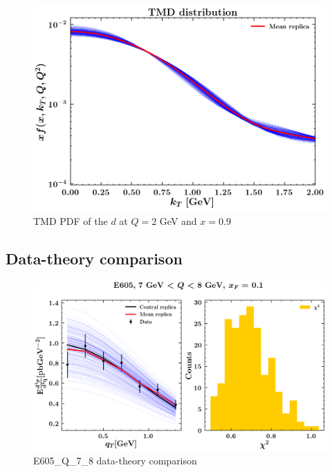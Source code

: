 \documentclass[
]{article}
\begin{document}
\begin{figure}
\centering
\includegraphics{pngplots/tmd_1_2_0.9.png}
\caption{TMD PDF of the \(d\) at \(Q = 2\) GeV and \(x = 0.9\)}
\end{figure}

\hypertarget{data-theory-comparison}{%
\subsection{Data-theory comparison}\label{data-theory-comparison}}

\begin{figure}
\centering
\includegraphics{pngplots/E605_Q_7_8.png}
\caption{E605\_Q\_7\_8 data-theory comparison}
\end{figure}
\end{document}
